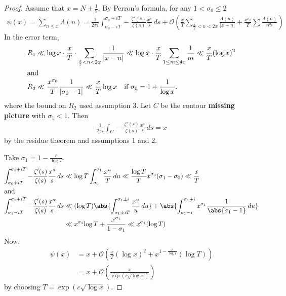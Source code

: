 \documentclass{article}
\newcommand{\1}{\mathbbm{1}}
\newcommand{\bigO}{\mathcal{O}}
\begin{document}
\begin{proof}
  Assume that $x = N + \frac{1}{2}$.
  By Perron's formula, for any $1 < \sigma_0 \leq 2$
  \begin{align*}
    \psi(x) = \sum_{n \leq x} \Lambda(n) = \frac{1}{2\pi i} \int_{\sigma_0-iT}^{\sigma_0+iT} -\frac{\zeta'(s)}{\zeta(s)} \frac{x^s}{s}\,ds + \bigO\left(\frac{x}{T} \sum_{\frac{x}{2}<n<2x} \frac{\Lambda(n)}{|x-n|} + \frac{x^{\sigma_0}}{T} \sum \frac{\Lambda(n)}{n^{\sigma_0}}\right)
  \end{align*}
  In the error term,
  \begin{align*}
    R_1 &\ll \log x \cdot \frac{x}{T} \cdot \sum_{\frac{x}{2} < n < 2x} \frac{1}{|x-n|} \ll \log x \cdot \frac{x}{T} \sum_{1 \leq m \leq 4x} \frac{1}{m} \ll \frac{x}{T} (\log x)^2 \\
    \shortintertext{and}
    R_2 &\ll \frac{x^{\sigma_0}}{T} \frac{1}{|\sigma_0-1|} \ll \frac{x}{T} \log x \quad \text{if } \sigma_0 = 1 + \frac{1}{\log x}.
  \end{align*}
  where the bound on $R_2$ used assumption 3.
  Let $C$ be the contour
  \textbf{missing picture}
  with $\sigma_1 < 1$.
  Then
  \begin{align*}
    \frac{1}{2\pi i} \int_C -\frac{\zeta'(s)}{\zeta(s)} \frac{x^s}{s}\,ds=x
  \end{align*}
  by the residue theorem and assumptions 1 and 2.

  Take $\sigma_1 = 1 - \frac{c}{\log T}$.
  \begin{align*}
    \int_{\sigma_0+iT}^{\sigma_1+iT} -\frac{\zeta'(s)}{\zeta(s)} \frac{x^s}{s}\,ds &\ll \log T \int_{\sigma_0}^{\sigma_1} \frac{x^u}{T}\,du \ll \frac{\log T}{T} x^{\sigma_0}(\sigma_1 - \sigma_0) \ll \frac{x}{T} \\
    \shortintertext{and}
    \int_{\sigma_1-iT}^{\sigma_1+iT} -\frac{\zeta'(s)}{\zeta(s)} \frac{x^s}{s}\,ds &\ll (\log T) \abs{\int_{\sigma_1\pm iT}^{\sigma_1\pm i} \frac{x^u}{u}\,du} + \abs{\int_{\sigma_1-i}^{\sigma_1+i} x^{\sigma_1}\frac{1}{\abs{\sigma_1-1}}\,du} \\
                                                                                   &\ll x^{\sigma_1}{\log T} + \frac{x^{\sigma_1}}{1-\sigma_1} \ll x^{\sigma_1} (\log T)
  \end{align*}
  Now,
  \begin{align*}
    \psi(x) &= x + \bigO\left(\frac{x}{T}(\log x)^2 + x^{1 - \frac{c}{\log T}}(\log T)\right) \\
            &= x + \bigO\left(\frac{x}{\exp(c \sqrt{\log x})}\right)
  \end{align*}
  by choosing $T = \exp(c \sqrt{\log x})$.
\end{proof}
\end{document}
